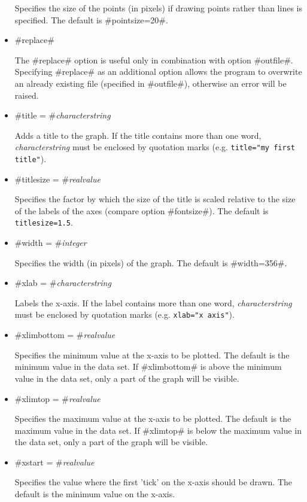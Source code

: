 \begin{itemize}
Specifies the size of the points (in pixels) if drawing points
rather than lines is specified. The default is #pointsize=20#.

\item #replace#

The #replace# option is useful only in combination with option
#outfile#. Specifying #replace# as an additional option allows the
program to overwrite an already existing file (specified in
#outfile#), otherwise an error will be raised.

\item #title = #{\em characterstring}

Adds a title to the graph. If the title contains more than one
word, {\em characterstring} must be enclosed by quotation marks
(e.g. \texttt{title="my first title"}).

\item #titlesize = #{\em realvalue}

Specifies the factor by which the size of the title is scaled
relative to the size of the labels of the axes (compare option
#fontsize#). The default is \texttt{titlesize=1.5}.

\item #width = #{\em integer}

Specifies the width (in pixels) of the graph. The default is
#width=356#.

\item #xlab = #{\em characterstring}

Labels the x-axis. If the label contains more than one word, {\em
characterstring} must be enclosed by quotation marks (e.g.
\texttt{xlab="x axis"}).

\item #xlimbottom = #{\em realvalue}

Specifies the minimum value at the x-axis to be plotted. The
default is the minimum value in the data set. If #xlimbottom# is
above the minimum value in the data set, only a part of the graph
will be visible.

\item #xlimtop = #{\em realvalue}

Specifies the maximum value at the x-axis to be plotted. The
default is the maximum value in the data set. If #xlimtop# is
below the maximum value in the data set, only a part of the graph
will be visible.

\item #xstart = #{\em realvalue}

Specifies the value where the first 'tick' on the x-axis should be
drawn. The default is the minimum value on the x-axis.


\end{itemize}
